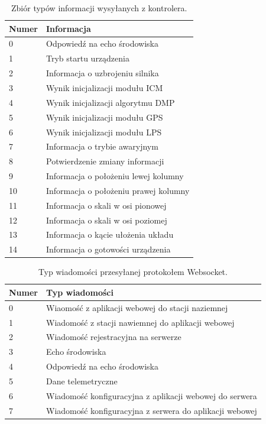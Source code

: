 \documentclass[12pt, a4paper]{article}
\begin{document}
\begin{table}[H]
\centering
\begin{tabular}{| l | l |}
\hline
\textbf{Numer} & \textbf{Informacja} \\
\hline
0 & Odpowiedź na echo środowiska \\
\hline
1 & Tryb startu urządzenia \\
\hline
2 & Informacja o uzbrojeniu silnika \\
\hline
3 & Wynik inicjalizacji modułu ICM \\
\hline
4 & Wynik inicjalizacji algorytmu DMP \\
\hline
5 & Wynik inicjalizacji modułu GPS \\
\hline
6 & Wynik inicjalizacji modułu LPS \\
\hline
7 & Informacja o trybie awaryjnym \\
\hline
8 & Potwierdzenie zmiany informacji \\
\hline
9 & Informacja o położeniu lewej kolumny \\
\hline
10 & Informacja o położeniu prawej kolumny \\
\hline
11 & Informacja o skali w osi pionowej \\
\hline
12 & Informacja o skali w osi poziomej \\
\hline
13 & Informacja o kącie ułożenia układu \\
\hline
14 & Informacja o gotowości urządzenia \\
\hline
\end{tabular}
\caption{Zbiór typów informacji wysyłanych z kontrolera.}
\end{table}

\begin{table}[H]
    \centering
    \begin{tabular}{| l | l |}
    \hline
    \textbf{Numer} & \textbf{Typ wiadomości} \\
    \hline
0 & Wiaomość z aplikacji webowej do stacji naziemnej \\
\hline
1 & Wiadomość z stacji nawiemnej do aplikacji webowej \\
\hline
2 & Wiadomość rejestracyjna na serwerze \\
\hline
3 & Echo środowiska \\
\hline
4 & Odpowiedź na echo środowiska \\
\hline
5 & Dane telemetryczne \\
\hline
6 & Wiadomość konfiguracyjna z aplikacji webowej do serwera \\
\hline
7 & Wiadomość konfiguracyjna z serwera do aplikacji webowej \\
\hline
    \end{tabular}
    \caption{Typ wiadomości przesyłanej protokołem Websocket.}
    \end{table}
\end{document}
